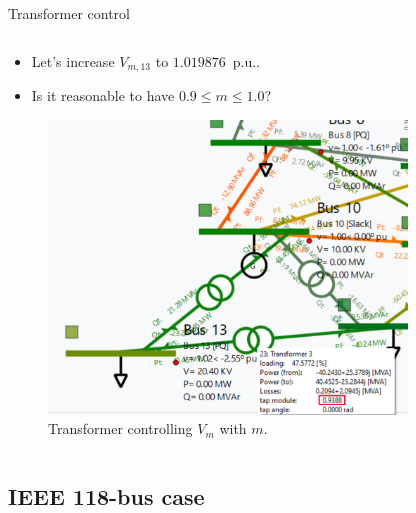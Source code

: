 \begin{frame}{Transformer control}
\begin{columns}
        \begin{column}{0.5\textwidth}
            \begin{itemize}
            \item Let's increase $V_{m,13}$ to $1.019876$~p.u..
            \item Is it reasonable to have $0.9 \leq m \leq 1.0$?
            \end{itemize}
            \begin{figure}[H]
                \centering
            \includegraphics[width=0.85\textwidth]{Images/17bus_trafo.png}
            \caption{Transformer controlling $V_m$ with $m$.}
            \label{fig:17bus3}
            \end{figure}
        \end{column}
    \end{columns}
\end{frame}


\subsection{IEEE 118-bus case}

